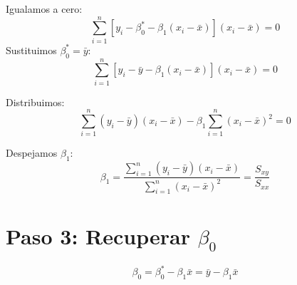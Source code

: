 \documentclass[12pt]{article}
\begin{document}
Igualamos a cero:
\[
\sum_{i=1}^{n} [y_i - \beta_0^* - \beta_1(x_i - \bar{x})](x_i - \bar{x}) = 0
\]
Sustituimos $\beta_0^* = \bar{y}$:
\[
\sum_{i=1}^{n} [y_i - \bar{y} - \beta_1(x_i - \bar{x})](x_i - \bar{x}) = 0
\]

Distribuimos:
\[
\sum_{i=1}^{n} (y_i - \bar{y})(x_i - \bar{x}) - \beta_1 \sum_{i=1}^{n} (x_i - \bar{x})^2 = 0
\]

Despejamos $\beta_1$:
\[
\beta_1 = \frac{\sum_{i=1}^{n} (y_i - \bar{y})(x_i - \bar{x})}{\sum_{i=1}^{n} (x_i - \bar{x})^2} = \frac{S_{xy}}{S_{xx}}
\]

\section*{Paso 3: Recuperar \( \beta_0 \)}
\[
\beta_0 = \beta_0^* - \beta_1 \bar{x} = \bar{y} - \beta_1 \bar{x}
\]
\end{document}
